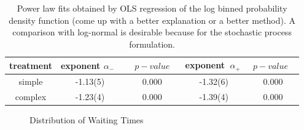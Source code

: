 \begin{table}
  \centering 
  \begin{tabular}{|c|c|c|c|c|}
	\hline
   treatment & exponent $\alpha_{-}$~&~$~p-value~$~& exponent $~\alpha_{+}~$ & $~p-value~$~\\
   \hline
  simple  & -1.13(5) & 0.000 &  -1.32(6) & 0.000\\
  complex &  -1.23(4) & 0.000 & -1.39(4) & 0.000\\
\hline
\end{tabular}
  \caption{Power law fits obtained by OLS regression of the log binned probability density function (come up with a better explanation or a better method). A comparison with log-normal is desirable because for the stochastic process formulation.}
  \label{pwlaw_fits}
\end{table}

\begin{figure}[h!]
\begin{center}
\caption{Distribution of Waiting Times}
\label{fig:waiting_times}
\end{center}
\end{figure}


